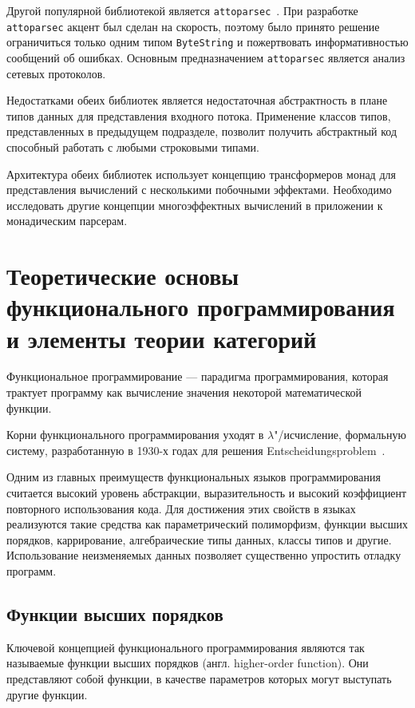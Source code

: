 Другой популярной библиотекой является
\lstinline{attoparsec}~\cite{attoparsec}. При разработке
\lstinline{attoparsec} акцент был сделан на скорость, поэтому было принято
решение ограничиться только одним типом \lstinline{ByteString} и пожертвовать
информативностью сообщений об ошибках. Основным предназначением
\lstinline{attoparsec} является анализ сетевых протоколов.

Недостатками обеих библиотек является недостаточная абстрактность в плане типов
данных для представления входного потока. Применение классов типов,
представленных в предыдущем подразделе, позволит получить абстрактный код
способный работать с любыми строковыми типами.

Архитектура обеих библиотек использует концепцию трансформеров монад для
представления вычислений с несколькими побочными эффектами. Необходимо
исследовать другие концепции многоэффектных вычислений в приложении к
монадическим парсерам.

\chapter{Теоретические основы функционального программирования и элементы теории 
         категорий}

Функциональное программирование --- парадигма программирования, которая трактует 
программу как вычисление значения некоторой математической функции.

Корни функционального программирования уходят в $\lambda$"/исчисление,
формальную систему, разработанную в 1930-х годах для решения
Entscheidungsproblem~\cite{entscheidungsproblem}.

Одним из главных преимуществ функциональных языков программирования считается
высокий уровень абстракции, выразительность и высокий коэффициент повторного
использования кода. Для достижения этих свойств в языках реализуются такие
средства как параметрический полиморфизм, функции высших порядков, каррирование,
алгебраические типы данных, классы типов и другие. Использование неизменяемых
данных позволяет существенно упростить отладку программ.

\section{Функции высших порядков}
Ключевой концепцией функционального программирования являются так называемые
функции высших порядков (англ. higher-order function). Они представляют собой
функции, в качестве параметров которых могут выступать другие функции.

